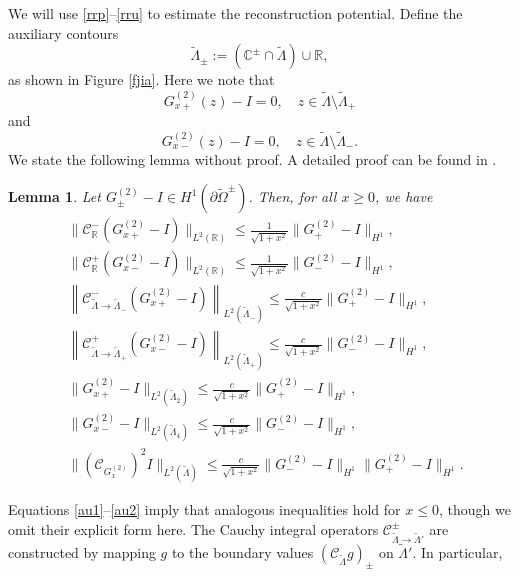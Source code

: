 \documentclass[preprint,compress,12pt]{elsarticle}
\newtheorem{lemma}[theorem]{Lemma}
\numberwithin{equation}{section}
\begin{document}
We will use \eqref{rrp}--\eqref{rru} to estimate the reconstruction potential.
Define the auxiliary contours
\begin{equation}
\widetilde{\Lambda}_{\pm}:=(\mathbb{C}^{\pm}\cap\widetilde{\Lambda})\cup\mathbb{R},
\end{equation}
as shown in Figure \ref{fjia}.  Here we note that
\begin{equation}\label{po1}
G^{(2)}_{x+}(z)-I=0,\quad z\in \widetilde{\Lambda}\setminus\widetilde{\Lambda}_{+}
\end{equation}
and
\begin{equation}\label{po2}
G^{(2)}_{x-}(z)-I=0,\quad z\in \widetilde{\Lambda}\setminus\widetilde{\Lambda}_{-}.
\end{equation}
We state the following lemma without proof. A detailed proof can be found in \cite{Zhou1998}.
\begin{lemma}\label{imlem}
Let $G^{(2)}_{\pm}-I\in H^{1}(\partial\widetilde{\Omega}^{\pm})$. Then, for all $x\geq0$, we have
\begin{align}
&\|\mathcal{C}_{\mathbb{R}}^{-}(G^{(2)}_{x+}-I)\|_{L^{2}(\mathbb{R})}\leq\frac{1}{\sqrt{1+x^{2}}}\|G^{(2)}_{+}-I\|_{H^{1}},\label{e1}\\
&\|\mathcal{C}_{\mathbb{R}}^{+}(G^{(2)}_{x-}-I)\|_{L^{2}(\mathbb{R})}\leq\frac{1}{\sqrt{1+x^{2}}}\|G^{(2)}_{-}-I\|_{H^{1}},\label{e2}\\
&\left\|\mathcal{C}_{\widetilde{\Lambda}\rightarrow\widetilde{\Lambda}_{-}}^{-}(G^{(2)}_{x+}-I)\right\|_{L^{2}(\widetilde{\Lambda}_{-})}\leq\frac{c}{\sqrt{1+x^{2}}}\|G^{(2)}_{+}-I\|_{H^{1}},\label{e3}\\
&\left\|\mathcal{C}_{\widetilde{\Lambda}\rightarrow\widetilde{\Lambda}_{+}}^{+}(G^{(2)}_{x-}-I)\right\|_{L^{2}(\widetilde{\Lambda}_{+})}\leq\frac{c}{\sqrt{1+x^{2}}}\|G^{(2)}_{-}-I\|_{H^{1}},\label{e4}\\
&\|G^{(2)}_{x+}-I\|_{L^{2}(\widetilde{\Lambda}_{2})}\leq\frac{c}{\sqrt{1+x^{2}}}\|G^{(2)}_{+}-I\|_{H^{1}},\label{e5}\\
&\|G^{(2)}_{x-}-I\|_{L^{2}(\widetilde{\Lambda}_{4})}\leq\frac{c}{\sqrt{1+x^{2}}}\|G^{(2)}_{-}-I\|_{H^{1}},\label{e6}\\
&\|(\mathcal{C}_{G^{(2)}_{x}})^{2}I\|_{L^{2}(\widetilde{\Lambda})}\leq\frac{c}{\sqrt{1+x^{2}}}\|G^{(2)}_{-}-I\|_{H^{1}}\|G^{(2)}_{+}-I\|_{H^{1}}.\label{e7}
\end{align}
\end{lemma}
Equations \eqref{au1}--\eqref{au2} imply that analogous inequalities hold for $x\leq0$, though we omit their explicit form here. The Cauchy integral operators $\mathcal{C}_{\widetilde{\Lambda}\rightarrow\widetilde{\Lambda}'}^{\pm}$ are constructed by mapping $g$ to the boundary values $(\mathcal{C}_{\widetilde{\Lambda}}g)_{\pm}$ on $\widetilde{\Lambda}'$. In particular,
\end{document}
